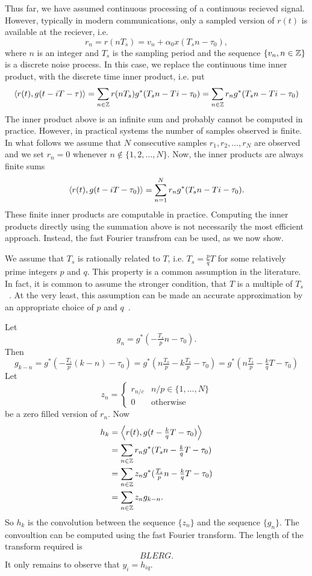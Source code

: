 \documentclass[a4paper,10pt]{article}
\begin{document}
Thus far, we have assumed continuous processing of a continuous recieved signal.  However, typically in modern communications, only a sampled version of $r(t)$ is available at the reciever, i.e.
\[
r_n = r(nT_s) = v_n + \alpha_0 x(T_sn - \tau_0),
\] 
where $n$  is an integer and $T_s$ is the sampling period and the sequence $\{v_n, n \in {\mathbb Z} \}$ is a discrete noise process.  In this case, we replace the continuous time inner product, with the discrete time inner product, i.e. put
\[
\left\langle r(t) , g(t - iT - \tau) \right\rangle = \sum_{n\in{\mathbb Z}}r(nT_s)g^*(T_sn - Ti - \tau_0) = \sum_{n\in{\mathbb Z}} r_n g^*(T_sn - Ti - \tau_0)
\]
The inner product above is an infinite sum and probably cannot be computed in practice.  However, in practical systems the number of samples observed is finite.  In what follows we assume that $N$ consecutive samples $r_1, r_2, \dots, r_N$ are observed and we set $r_n = 0$ whenever $n \notin \{1, 2, \dots, N\}$.  Now, the inner products are always finite sums
\[
\left\langle r(t) , g(t - iT - \tau_0) \right\rangle =  \sum_{n=1}^N r_n g^*(T_sn - Ti - \tau_0).
\]
These finite inner products are computable in practice.  Computing the inner products directly using the summation above is not necessarily the most efficient approach.  Instead, the fast Fourier transfrom can be used, as we now show.

We assume that $T_s$ is rationally related to $T$, i.e. $T_s = \frac{p}{q}T$ for some relatively prime integers $p$ and $q$.  This property is a common assumption in the literature.  In fact, it is common to assume the stronger condition, that $T$ is a multiple of $T_s$~\cite{Oerder_synch_square_circstat_2008}.  At the very least, this assumption can be made an accurate approximation by an appropriate choice of $p$ and $q$~\cite{Mordell_Diophantine_equations_1969,Clarkson_thesis}.

Let 
\[
g_n = g^*(-\tfrac{T_s}{p} n - \tau_0).
\]
Then
\[
g_{k-n} = g^*(-\tfrac{T_s}{p}(k - n) - \tau_0) = g^*(n\tfrac{T_s}{p} - k\tfrac{T_s}{p} - \tau_0) = g^*(n\tfrac{T_s}{p} - \tfrac{k}{q}T - \tau_0)
\]
Let
\begin{equation} \label{eq:zzerofill}
z_n = \begin{cases} 
r_{n/c} & n/p \in \{1, \dots, N \} \\
0 & \text{otherwise}
\end{cases}
\end{equation}
be a zero filled version of $r_n$.  Now
\begin{align*}
h_k &= \left\langle r(t) , g(t - \tfrac{k}{q}T - \tau_0) \right\rangle \\
&=  \sum_{n\in{\mathbb Z}} r_n g^*(T_sn - \tfrac{k}{q}T - \tau_0) \\
&= \sum_{n\in{\mathbb Z}} z_n g^*(\tfrac{T_s}{p}n - \tfrac{k}{q}T - \tau_0) \\
&= \sum_{n\in{\mathbb Z}} z_n g_{k-n}.
\end{align*}
So $h_k$ is the convolution between the sequence $\{z_n\}$ and the sequence $\{g_n\}$.  The convoultion can be computed using the fast Fourier transform.  The length of the transform required is
\[
BLERG.
\]  
It only remains to observe that $y_i = h_{iq}$.





\end{document}

